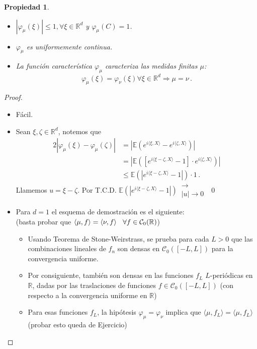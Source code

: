 \documentclass[letterpaper,11pt]{article} %
\def\espacio{\hspace{.25cm}\,}
\theoremstyle{defbreak}
\theoremstyle{propbreak}
\newtheorem{property}{Propiedad}[subsection]
\theoremstyle{remark}
\theoremstyle{break}
\def\R{\mathbb{R}}
\def\E{\mathbb{E}}
\def\ejercicio{\color{blue}Ejercicio\color{black}}
\def\beforeitemize{\leavevmode \vspace{-0.5\baselineskip}}
\def\gris{\color{mygray}}
\begin{document}
\vspace{2cm}
\begin{property}
\beforeitemize
\begin{itemize}
    \item[(i)] $|\varphi_\mu(\xi)|\leq 1,  \forall \xi \in\mathbb{R}^d$ y $\varphi_\mu(C)=1$.
    \item[(ii)] $\varphi_\mu$ es uniformemente continua.
    \item[(iii)] La función característica $\varphi_\mu$ caracteriza las medidas finitas $\mu$:
    $$ \varphi_\mu(\xi)=\varphi_\nu(\xi) \forall \xi\in\mathbb{R}^d\Longrightarrow\mu=\nu \, .$$
\end{itemize}
\end{property}
\begin{proof}
\gris
\beforeitemize
\begin{itemize}
    \item[(i)] Fácil.
    \item[(ii)] Sean $\xi,\zeta\in\R^d$, notemos que
    \begin{alignat*}{2}
        |\varphi_\mu(\xi)-\varphi_\mu(\zeta)| & = |\E(e^{i\langle\xi,X\rangle}-e^{i\langle\zeta,X\rangle})| \\
         & = |\E([e^{i\langle\xi-\zeta,X\rangle}-1]\cdot e^{i\langle\zeta,X\rangle})| \\
         & \leq \E(|e^{i\langle\xi-\zeta,X\rangle}-1|)\cdot 1 \, .
    \end{alignat*}
    Llamemos $u=\xi-\zeta$. Por T.C.D. $\E(|e^{i\langle\xi-\zeta,X\rangle}-1|)\,\substack{\longrightarrow \\ |u|\to 0}\mbox{ }0$
    \item[(iii)]
    Para $d=1$ el esquema de demostración es el siguiente: %
    \\ (basta probar que $\langle \mu,f\rangle = \langle\nu,f\rangle \espacio \forall f\in\mathcal{C}_0(\R)$)
    \begin{itemize}
        \item Usando Teorema de Stone-Weirstrass, se prueba para cada $L>0$ que las combinaciones lineales de $f_n$ son densas en $\mathcal{C}_0([-L,L])$ para la convergencia uniforme.
        \item Por consiguiente, también son densas en las funciones $f_L$ $L$-periódicas en $\R$, dadas por las traslaciones de funciones $f\in\mathcal{C}_0([-L,L])$ (con respecto a la convergencia uniforme en $\R$)
        \item Para esas funciones $f_L$, la hipótesis $\varphi_\mu=\varphi_\nu$ implica que $\langle\mu,f_L\rangle=\langle\mu,f_L\rangle$ (probar esto queda de \ejercicio\gris)

\end{itemize}
\end{itemize}
\end{proof}
\end{document}
